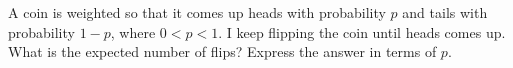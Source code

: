 A coin is weighted so that it comes up heads with probability $p$ and tails with probability $1-p$, where $0<p<1$. I keep flipping the coin until heads comes up. What is the expected number of flips? Express the answer in terms of $p$.
